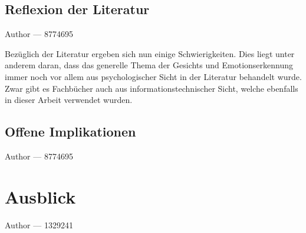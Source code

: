 \documentclass[12pt, a4paper]{report}
\makeatletter
\newcommand{\sectionauthor}[1]{%
  {\parindent0pt\vspace*{-5pt}%
  \large{Author --- }
  \linespread{1.1}\large\scshape#1%
  \par\nobreak\vspace*{35pt} }
  \@afterheading%
}
\newcommand{\chapterauthor}[1]{%
  {\parindent0pt\vspace*{-25pt}%
  \large{Author --- }
  \linespread{1.1}\large\scshape#1%
  \par\nobreak\vspace*{35pt} }
  \@afterheading%
}
\makeatother
\begin{document}
\section{Reflexion der Literatur}
\sectionauthor{8774695}
Bezüglich der Literatur ergeben sich nun einige Schwierigkeiten. Dies liegt unter anderem daran, dass das generelle Thema der Gesichts und Emotionserkennung immer noch vor allem aus
psychologischer Sicht in der Literatur behandelt wurde. Zwar gibt es Fachbücher auch aus informationstechnischer Sicht, welche ebenfalls in dieser Arbeit verwendet wurden.

\section{Offene Implikationen}
\sectionauthor{8774695}

\chapter{Ausblick}
\chapterauthor{1329241}
\end{document}
